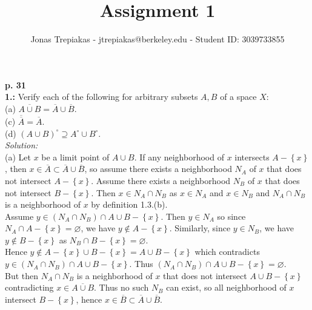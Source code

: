 \documentclass[a4paper]{article}
\title{Assignment 1}
\author{Jonas Trepiakas - jtrepiakas@berkeley.edu - Student ID: 3039733855}
\date{}
\begin{document}
\maketitle
\newpage

    \textbf{p. 31}\\
    \textbf{1.:} Verify each of the following for arbitrary subsets $A,B$ of
    a space $X:$ \\
    \linebreak
    (a) $\overline{A \cup B} = \overline{A} \cup \overline{B}$.\\
    (c) $\overline{ \overline{A}} = \overline{A}$.\\
    (d) $\left( A \cup B \right)^{\circ} \supseteq A^{\circ}
    \cup B^{\circ}$.\\
    \linebreak
    \textit{Solution:}\\
    (a) Let  $x$ be a limit point of $A \cup B$. If any neighborhood of 
    $x$ intersects $A - \left\{ x \right\} $, then $x \in \overline{A} \subset 
    \overline{A} \cup \overline{B}$, so assume there exists a neighborhood
    $N_A$
    of $x$ that does not intersect $A - \left\{ x \right\} $. Assume there
    exists a neighborhood $N_B$ of $x$ that does not intersect $B- \left\{
    x \right\} $. Then $x \in N_A \cap N_B$ as $x \in N_A$ and $x \in N_B$ and
    $N_A \cap N_B$ is a neighborhood of $x$ by definition 1.3.(b).\\
    Assume $y \in \left( N_A \cap N_B \right) \cap A\cup B - \left\{ x \right\}
    $. Then $y \in N_A$ so since $N_A \cap A -\left\{ x \right\}
    = \varnothing$, we have $y \not\in A -\left\{ x \right\} $. Similarly,
    since
    $y \in N_B$, we have $y \not\in B - \left\{ x \right\} $ as $N_B \cap
    B - \left\{ x \right\} = \varnothing$.\\
    Hence $y \not\in  A -\left\{ x \right\} \cup B -\left\{ x \right\} 
    = A\cup B - \left\{ x \right\} $ which contradicts
    $y \in \left( N_A \cap N_B \right) \cap A \cup B - \left\{ x \right\} $.
    Thus $(N_A \cap N_B) \cap A \cup B - \left\{ x \right\} = \varnothing$.\\
    But then $N_A \cap N_B$ is a neighborhood of $x$ that does not intersect
    $A\cup B - \left\{ x \right\} $ contradicting $x \in \overline{A \cup B}$.
    Thus no such $N_B$ can exist, so all neighborhood of $x$ intersect
    $B - \left\{ x \right\} $, hence $x \in \overline{B} \subset \overline{A}\cup 
    \overline{B}$.\\
    
\end{document}
